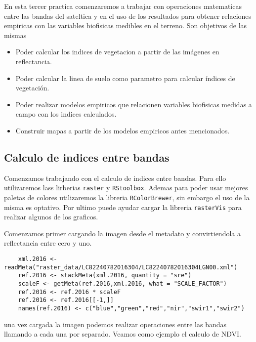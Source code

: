 En esta tercer practica comenzaremos a trabajar con operaciones matematicas
entre las bandas del sateltica y en el uso de los resultados para obtener
relaciones empiricas con las variables biofisicas medibles en el terreno. Son
objetivos de las mismas

\begin{itemize}
    \item Poder calcular los indices de vegetacion a partir de las imágenes en
        reflectancia.
    \item Poder calcular la linea de suelo como parametro para calcular índices
        de vegetación.
    \item Poder realizar modelos empiricos que relacionen variables biofisicas
        medidas a campo con los indices calculados.
    \item Construir mapas a partir de los modelos empiricos antes mencionados.
\end{itemize}


\subsection{Calculo de indices entre bandas}
Comenzamos trabajando con el calculo de indices entre bandas. Para ello
utilizaremos lass lirberias \texttt{raster} y \texttt{RStoolbox}. Ademas para
poder usar mejores paletas de colores utilizaremos la libreria
\texttt{RColorBrewer}, sin embargo el uso de la misma es optativo. Por ultimo
puede ayudar cargar la libreria \texttt{rasterVis} para realizar algunos de los
graficos.

Comenzamos primer cargando la imagen desde el metadato y convirtiendola a
reflectancia entre cero y uno.

\begin{lstlisting}
    xml.2016 <- readMeta("raster_data/LC82240782016304/LC82240782016304LGN00.xml")
    ref.2016 <- stackMeta(xml.2016, quantity = "sre")
    scaleF <- getMeta(ref.2016,xml.2016, what = "SCALE_FACTOR")
    ref.2016 <- ref.2016 * scaleF
    ref.2016 <- ref.2016[[-1,]]
    names(ref.2016) <- c("blue","green","red","nir","swir1","swir2")
\end{lstlisting}

una vez cargada la imagen podemos realizar operaciones entre las bandas llamando
a cada una por separado. Veamos como ejemplo el calculo de NDVI\@.

